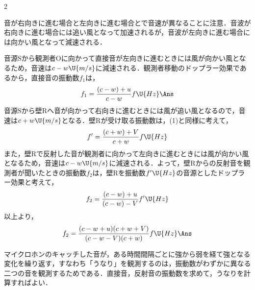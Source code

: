\begin{multicols}{2}
\par\nopagebreak
\begin{sisin}
音が右向きに進む場合と左向きに進む場合とで音速が異なることに注意．音波が右向きに進む場合には追い風となって加速されるが，音波が左向きに進む場合には向かい風となって減速される．
\end{sisin}
\KaiHead
\begin{komon}
 音源$\mathrm{S}$から観測者$\mathrm{O}$に向かって直接音が左向きに進むときには風が向かい風となるため，音速は$c-w\U{m/s}$に減速される．観測者移動のドップラー効果であるから，直接音の振動数$f_1$は，
       \[f_1=\frac{(c-w)+u}{c-w}f\U{Hz}\Ans\]
 音源$\mathrm{S}$から壁$\mathrm{R}$へ音が向かって右向きに進むときには風が追い風となるので，音速は$c+w\U{m/s}$となる．壁$\mathrm{R}$が受け取る振動数は，(1)と同様に考えて，
       \[f^\prime=\frac{(c+w)+V}{c+w}f\U{Hz}\]
       また，壁$\mathrm{R}$で反射した音が観測者に向かって左向きに進むときには風が向かい風となるため，音速は$c-w\U{m/s}$に減速される．よって，壁$\mathrm{R}$からの反射音を観測者が聞いたときの振動数$f_2$は，壁$\mathrm{R}$を振動数$f^\prime\U{Hz}$の音源としたドップラー効果と考えて，
       \[f_2=\frac{(c-w)+u}{(c-w)-V}f^\prime\U{Hz}\]
       以上より，
       \[f_2=\frac{(c-w+u)(c+w+V)}{(c-w-V)(c+w)}f\U{Hz}\Ans\]
\end{komon}

\par\nopagebreak
\begin{sisin}
マイクロホンのキャッチした音が，ある時間間隔ごとに強から弱を経て強となる変化を繰り返す，すなわち「うなり」を観測するのは，振動数がわずかに異なる二つの音を観測するためである．直接音，反射音の振動数を求めて，うなりを計算すればよい．


\end{sisin}
\end{multicols}
